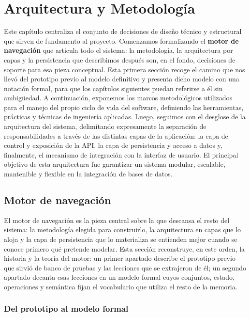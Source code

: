 \chapter{Arquitectura y Metodología}
\label{cap:arquitecturaMetodologia}

Este capítulo centraliza el conjunto de decisiones de diseño técnico y estructural que sirven de fundamento al proyecto.
Comenzamos formalizando el \textbf{motor de navegación} que articula todo el sistema: la metodología, la arquitectura por capas
y la persistencia que describimos después son, en el fondo, decisiones de soporte para esa pieza conceptual. Esta primera
sección recoge el camino que nos llevó del prototipo previo al modelo definitivo y presenta dicho modelo con una notación formal,
para que los capítulos siguientes puedan referirse a él sin ambigüedad.
A continuación, exponemos los marcos metodológicos utilizados para el manejo del propio ciclo de vida del software,
definiendo las herramientas, prácticas y técnicas de ingeniería aplicadas.
Luego, seguimos con el desglose de la arquitectura del sistema, delimitando expresamente la separación de responsabilidades
a través de las distintas capas de la aplicación: la capa de control y exposición de la API, la capa de persistencia y acceso a datos
y, finalmente, el mecanismo de integración con la interfaz de usuario. El principal objetivo de esta arquitectura fue garantizar
un sistema modular, escalable, mantenible y flexible en la integración de bases de datos.

\section{Motor de navegación}
\label{sec:motorNavegacion}

El motor de navegación es la pieza central sobre la que descansa el resto del sistema: la metodología
elegida para construirlo, la arquitectura en capas que lo aloja y la capa de persistencia que lo materializa
se entienden mejor cuando se conoce primero qué pretende modelar. Esta sección reconstruye, en este orden, la
historia y la teoría del motor: un primer apartado describe el prototipo previo que sirvió de banco de pruebas
y las lecciones que se extrajeron de él; un segundo apartado decanta esas lecciones en un modelo formal cuyos
conjuntos, estado, operaciones y semántica fijan el vocabulario que utiliza el resto de la memoria.

\subsection{Del prototipo al modelo formal}
\label{subsec:prototipoModeloFormal}

